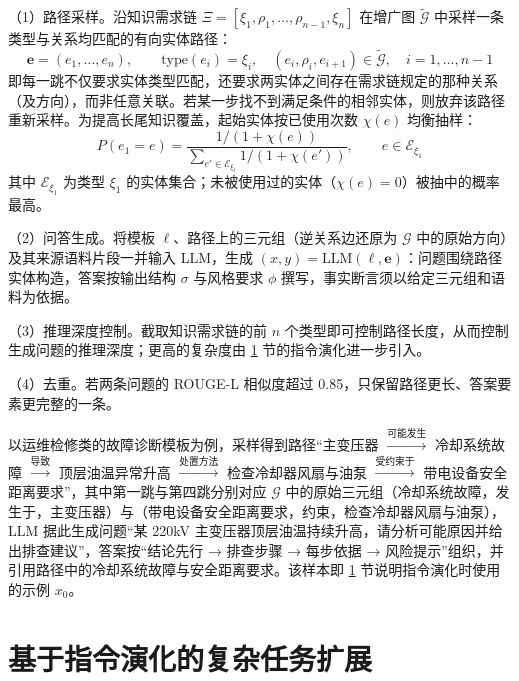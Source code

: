 \documentclass[fontset=fandol,type=master,campus=shenzhen,etitleauto=true]{hithesisbook}
\begin{document}
（1）路径采样。沿知识需求链 $\Xi = [\xi_1, \rho_1, \ldots, \rho_{n-1}, \xi_n]$ 在增广图 $\tilde{\mathcal{G}}$ 中采样一条类型与关系均匹配的有向实体路径：
\begin{equation}\label{eq:path}
\mathbf{e} = (e_1, \ldots, e_n), \qquad \text{type}(e_i) = \xi_i, \quad (e_i, \rho_i, e_{i+1}) \in \tilde{\mathcal{G}}, \quad i = 1, \ldots, n-1
\end{equation}
即每一跳不仅要求实体类型匹配，还要求两实体之间存在需求链规定的那种关系（及方向），而非任意关联。若某一步找不到满足条件的相邻实体，则放弃该路径重新采样。为提高长尾知识覆盖，起始实体按已使用次数 $\chi(e)$ 均衡抽样：
\begin{equation}\label{eq:start-entity}
P(e_1 = e) = \frac{1 / (1 + \chi(e))}{\sum_{e' \in \mathcal{E}_{\xi_1}} 1 / (1 + \chi(e'))}, \qquad e \in \mathcal{E}_{\xi_1}
\end{equation}
其中 $\mathcal{E}_{\xi_1}$ 为类型 $\xi_1$ 的实体集合；未被使用过的实体（$\chi(e) = 0$）被抽中的概率最高。

（2）问答生成。将模板 $\ell$、路径上的三元组（逆关系边还原为 $\mathcal{G}$ 中的原始方向）及其来源语料片段一并输入 LLM，生成 $(x, y) = \text{LLM}(\ell, \mathbf{e})$：问题围绕路径实体构造，答案按输出结构 $\sigma$ 与风格要求 $\phi$ 撰写，事实断言须以给定三元组和语料为依据。

（3）推理深度控制。截取知识需求链的前 $n$ 个类型即可控制路径长度，从而控制生成问题的推理深度；更高的复杂度由 \ref{ux57faux4e8eux6307ux4ee4ux6f14ux5316ux7684ux590dux6742ux4efbux52a1ux6269ux5c55} 节的指令演化进一步引入。

（4）去重。若两条问题的 ROUGE-L 相似度\cite{ref75}超过 0.85，只保留路径更长、答案要素更完整的一条。

以运维检修类的故障诊断模板为例，采样得到路径“主变压器 $\xrightarrow{\text{可能发生}}$ 冷却系统故障 $\xrightarrow{\text{导致}}$ 顶层油温异常升高 $\xrightarrow{\text{处置方法}}$ 检查冷却器风扇与油泵 $\xrightarrow{\text{受约束于}}$ 带电设备安全距离要求”，其中第一跳与第四跳分别对应 $\mathcal{G}$ 中的原始三元组（冷却系统故障，发生于，主变压器）与（带电设备安全距离要求，约束，检查冷却器风扇与油泵），LLM 据此生成问题“某 220kV 主变压器顶层油温持续升高，请分析可能原因并给出排查建议”，答案按“结论先行 → 排查步骤 → 每步依据 → 风险提示”组织，并引用路径中的冷却系统故障与安全距离要求。该样本即 \ref{ux57faux4e8eux6307ux4ee4ux6f14ux5316ux7684ux590dux6742ux4efbux52a1ux6269ux5c55} 节说明指令演化时使用的示例 $x_0$。

\section{基于指令演化的复杂任务扩展}\label{ux57faux4e8eux6307ux4ee4ux6f14ux5316ux7684ux590dux6742ux4efbux52a1ux6269ux5c55}
\end{document}
